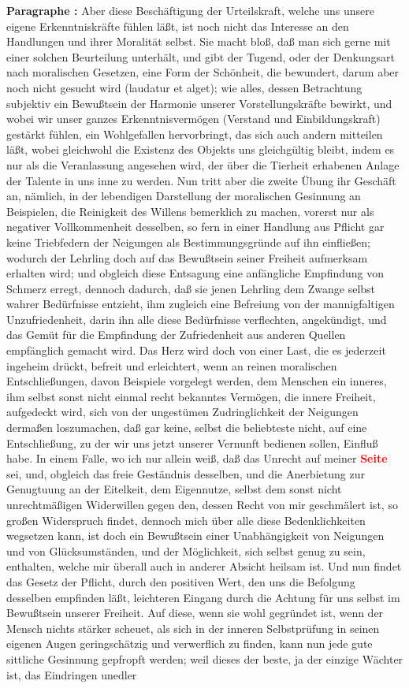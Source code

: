 \documentclass[a4paper,12pt,twoside]{book}
\newcommand{\match}[1]{\textcolor{red}{\textbf{#1}}}
\begin{document}
	\noindent\textbf{Paragraphe : }Aber diese Beschäftigung der Urteilskraft, welche uns unsere eigene Erkenntniskräfte fühlen läßt, ist noch nicht das Interesse an den Handlungen und ihrer Moralität selbst. Sie macht bloß, daß man sich gerne mit einer solchen Beurteilung unterhält, und gibt der Tugend, oder der Denkungsart nach moralischen Gesetzen, eine Form der Schönheit, die bewundert, darum aber noch nicht gesucht wird (laudatur et alget); wie alles, dessen Betrachtung subjektiv ein Bewußtsein der Harmonie unserer Vorstellungskräfte bewirkt, und wobei wir unser ganzes Erkenntnisvermögen (Verstand und Einbildungskraft) gestärkt fühlen, ein Wohlgefallen hervorbringt, das sich auch andern mitteilen läßt, wobei gleichwohl die Existenz des Objekts uns gleichgültig bleibt, indem es nur als die Veranlassung angesehen wird, der über die Tierheit erhabenen Anlage der Talente in uns inne zu werden. Nun tritt aber die zweite Übung ihr Geschäft an, nämlich, in der lebendigen Darstellung der moralischen Gesinnung an Beispielen, die Reinigkeit des Willens bemerklich zu machen, vorerst nur als negativer Vollkommenheit desselben, so fern in einer Handlung aus Pflicht gar keine Triebfedern der Neigungen als Bestimmungsgründe auf ihn einfließen; wodurch der Lehrling doch auf das Bewußtsein seiner Freiheit aufmerksam erhalten wird; und obgleich diese Entsagung eine anfängliche Empfindung von Schmerz erregt, dennoch dadurch, daß sie jenen Lehrling dem Zwange selbst wahrer Bedürfnisse entzieht, ihm zugleich eine Befreiung von der mannigfaltigen Unzufriedenheit, darin ihn alle diese Bedürfnisse verflechten, angekündigt, und das Gemüt für die Empfindung der Zufriedenheit aus anderen Quellen empfänglich gemacht wird. Das Herz wird doch von einer Last, die es jederzeit ingeheim drückt, befreit  und erleichtert, wenn an reinen moralischen Entschließungen, davon Beispiele vorgelegt werden, dem Menschen ein inneres, ihm selbst sonst nicht einmal recht bekanntes Vermögen, die innere Freiheit, aufgedeckt wird, sich von der ungestümen Zudringlichkeit der Neigungen dermaßen loszumachen, daß gar keine, selbst die beliebteste nicht, auf eine Entschließung, zu der wir uns jetzt unserer Vernunft bedienen sollen, Einfluß habe. In einem Falle, wo ich nur allein weiß, daß das Unrecht auf meiner \match{Seite} sei, und, obgleich das freie Geständnis desselben, und die Anerbietung zur Genugtuung an der Eitelkeit, dem Eigennutze, selbst dem sonst nicht unrechtmäßigen Widerwillen gegen den, dessen Recht von mir geschmälert ist, so großen Widerspruch findet, dennoch mich über alle diese Bedenklichkeiten wegsetzen kann, ist doch ein Bewußtsein einer Unabhängigkeit von Neigungen und von Glücksumständen, und der Möglichkeit, sich selbst genug zu sein, enthalten, welche mir überall auch in anderer Absicht heilsam ist. Und nun findet das Gesetz der Pflicht, durch den positiven Wert, den uns die Befolgung desselben empfinden läßt, leichteren Eingang durch die Achtung für uns selbst im Bewußtsein unserer Freiheit. Auf diese, wenn sie wohl gegründet ist, wenn der Mensch nichts stärker scheuet, als sich in der inneren Selbstprüfung in seinen eigenen Augen geringschätzig und verwerflich zu finden, kann nun jede gute sittliche Gesinnung gepfropft werden; weil dieses der beste, ja der einzige Wächter ist, das Eindringen unedler 
\end{document}
